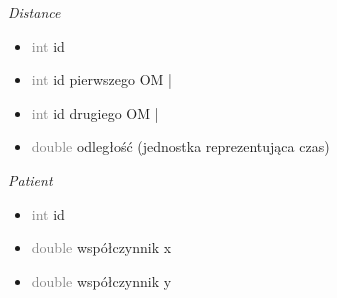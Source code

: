 \documentclass[]{article}
\begin{document}
    \textit{Distance}
    \begin{itemize}
        \item \textcolor{gray}{int}  id
        \item  \textcolor{gray}{int} id pierwszego OM |
        \item  \textcolor{gray}{int} id drugiego OM |
        \item \textcolor{gray}{double}  odległość (jednostka reprezentująca czas)
    \end{itemize}

    \textit{Patient}
    \begin{itemize}
        \item  \textcolor{gray}{int} id
        \item \textcolor{gray}{double}  współczynnik x
        \item \textcolor{gray}{double}  współczynnik y
    \end{itemize}
\end{document}
